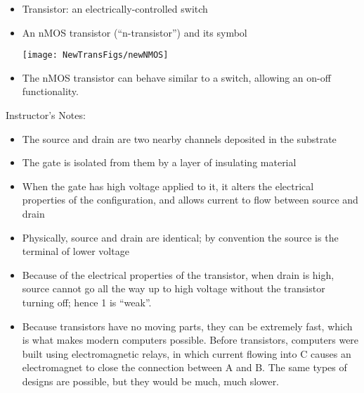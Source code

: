 \setlength{\columnseprule}{1pt}
\def\columnseprulecolor{\color{blue}}


\begin{frame}[fragile]
\begin{itemize}
\item Transistor: an electrically-controlled switch


\item An nMOS transistor (``n-transistor'') and its symbol
\begin{multicols}{2}
\centering
{}

\columnbreak
\texttt{[image: NewTransFigs/newNMOS]}
 
\end{multicols}

\item The nMOS transistor can behave similar to a switch, allowing an on-off functionality.
\end{itemize}
\end{frame}
\BNotes\ifnum{}
\begin{frame}[fragile]
Instructor's Notes:
\begin{itemize}
\item The source and drain are two nearby channels deposited in the substrate
\item The gate is isolated from them by a layer of insulating material
\item When the gate has high voltage applied to it, it alters the electrical properties of the configuration, and allows current to flow between source and drain
\item Physically, source and drain are identical; by convention the source is the terminal of lower voltage
\item Because of the electrical properties of the transistor, when drain is high, source cannot go all the way up to high voltage without the transistor turning off; hence 1 is ``weak''.
\item Because transistors have no moving
parts, they can be extremely fast, which is what makes modern
computers possible. Before transistors, computers were built using
electromagnetic relays, in which current flowing into C causes an
electromagnet to close the connection between A and B. The same types
of designs are possible, but they would be much, much slower.

\end{itemize}
\end{frame}
\fi\ENotes


